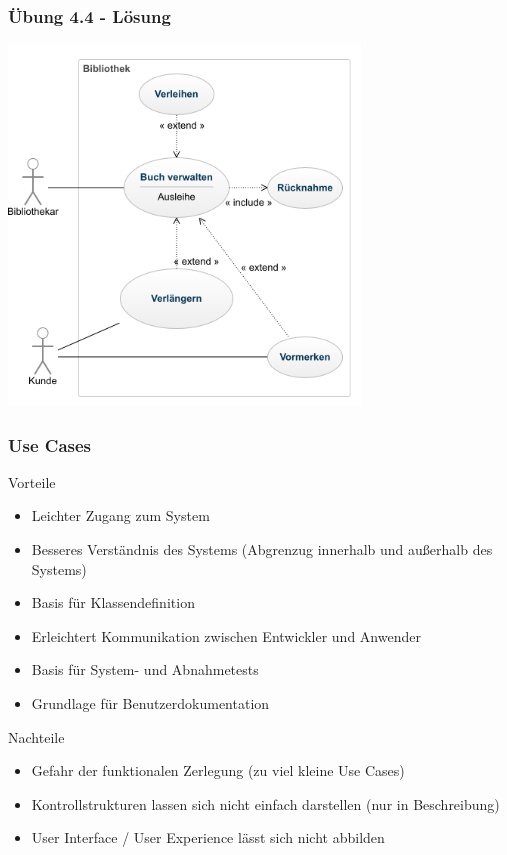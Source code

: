 \ifloesung
\begin{frame}
\frametitle{Übung 4.4 - Lösung}
	\includegraphics[width=0.7\textwidth,
	keepaspectratio=true]{bilder/use_case_aufg4_lsg.png}
\end{frame}
\fi

\begin{frame}
\frametitle{Use Cases}
	Vorteile
	\begin{itemize}
		\item Leichter Zugang zum System
		\item Besseres Verständnis des Systems (Abgrenzug innerhalb und außerhalb des Systems)
		\item Basis für Klassendefinition
		\item Erleichtert Kommunikation zwischen Entwickler und Anwender
		\item Basis für System- und Abnahmetests
		\item Grundlage für Benutzerdokumentation
	\end{itemize}
	\bigskip
	Nachteile
	\begin{itemize}
		\item Gefahr der funktionalen Zerlegung (zu viel kleine Use Cases)
		\item Kontrollstrukturen lassen sich nicht einfach darstellen (nur in Beschreibung)
		\item User Interface / User Experience lässt sich nicht abbilden
	\end{itemize}
\end{frame}

